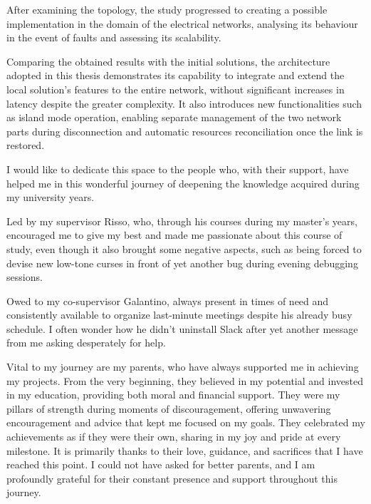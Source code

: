 \documentclass[%
	corpo=11pt,
    twoside,
    stile=classica,
    oldstyle,
    tipotesi=custom,
    greek,
    evenboxes,
]{toptesi}
\begin{document}
After examining the topology, the study progressed to creating a possible implementation in the domain of the electrical networks, analysing its behaviour in the event of faults and assessing its scalability. 

Comparing the obtained results with the initial solutions, the architecture adopted in this thesis demonstrates its capability to integrate and extend the local solution’s features to the entire network, without significant increases in latency despite the greater complexity. It also introduces new functionalities such as island mode operation, enabling separate management of the two network parts during disconnection and automatic resources reconciliation once the link is restored.



\ringraziamenti%
I would like to dedicate this space to the people who, with their support, have helped me in this wonderful journey of deepening the knowledge acquired during my university years.

Led by my supervisor Risso, who, through his courses during my master's years, encouraged me to give my best and made me passionate about this course of study, even though it also brought some negative aspects, such as being forced to devise new low-tone curses in front of yet another bug during evening debugging sessions.

Owed to my co-supervisor Galantino, always present in times of need and consistently available to organize last-minute meetings despite his already busy schedule. I often wonder how he didn’t uninstall Slack after yet another message from me asking desperately for help.

Vital to my journey are my parents, who have always supported me in achieving my projects. From the very beginning, they believed in my potential and invested in my education, providing both moral and financial support. They were my pillars of strength during moments of discouragement, offering unwavering encouragement and advice that kept me focused on my goals. They celebrated my achievements as if they were their own, sharing in my joy and pride at every milestone. It is primarily thanks to their love, guidance, and sacrifices that I have reached this point. I could not have asked for better parents, and I am profoundly grateful for their constant presence and support throughout this journey.
\end{document}
